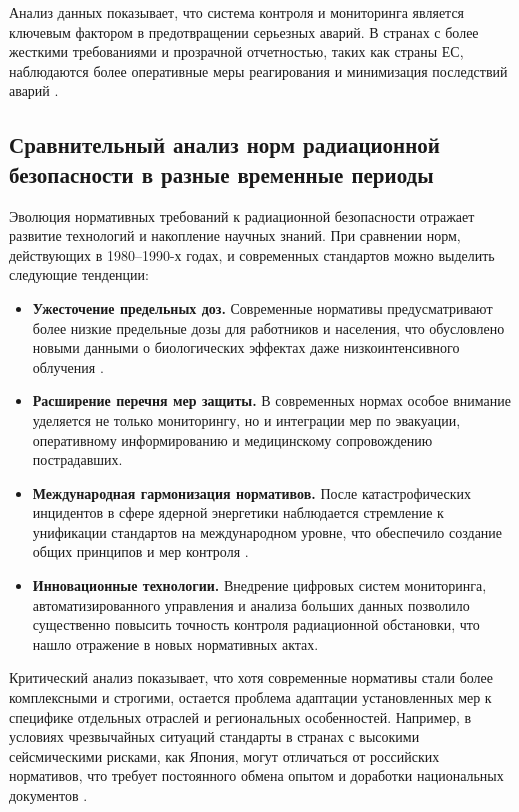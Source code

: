 \documentclass[a4paper, 14pt]{extarticle}
\begin{document}
Анализ данных показывает, что система контроля и мониторинга является ключевым фактором в предотвращении серьезных аварий. В странах с более жесткими требованиями и прозрачной отчетностью, таких как страны ЕС, наблюдаются более оперативные меры реагирования и минимизация последствий аварий \cite{7}.

\subsection{Сравнительный анализ норм радиационной безопасности в разные временные периоды}

Эволюция нормативных требований к радиационной безопасности отражает развитие технологий и накопление научных знаний. При сравнении норм, действующих в 1980--1990-х годах, и современных стандартов можно выделить следующие тенденции:

\begin{itemize}
    \item \textbf{Ужесточение предельных доз.} Современные нормативы предусматривают более низкие предельные дозы для работников и населения, что обусловлено новыми данными о биологических эффектах даже низкоинтенсивного облучения \cite{5,16}.

    \item \textbf{Расширение перечня мер защиты.} В современных нормах особое внимание уделяется не только мониторингу, но и интеграции мер по эвакуации, оперативному информированию и медицинскому сопровождению пострадавших.

    \item \textbf{Международная гармонизация нормативов.} После катастрофических инцидентов в сфере ядерной энергетики наблюдается стремление к унификации стандартов на международном уровне, что обеспечило создание общих принципов и мер контроля \cite{4,7}.

    \item \textbf{Инновационные технологии.} Внедрение цифровых систем мониторинга, автоматизированного управления и анализа больших данных позволило существенно повысить точность контроля радиационной обстановки, что нашло отражение в новых нормативных актах.
\end{itemize}

Критический анализ показывает, что хотя современные нормативы стали более комплексными и строгими, остается проблема адаптации установленных мер к специфике отдельных отраслей и региональных особенностей. Например, в условиях чрезвычайных ситуаций стандарты в странах с высокими сейсмическими рисками, как Япония, могут отличаться от российских нормативов, что требует постоянного обмена опытом и доработки национальных документов \cite{13}.
\end{document}
